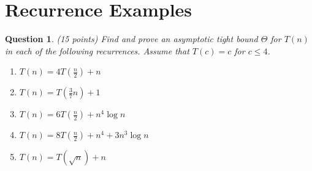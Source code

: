 \documentclass[a4paper]{article}
\theoremstyle{remarksStyle}
\theoremstyle{questionStyle}
\newtheorem{question}{Question}
\theoremstyle{answerStyle}
\begin{document}
\section {Recurrence Examples}
\begin{question} (15 points)
Find and prove an asymptotic tight bound $\Theta$ for $T(n)$ in each of the following recurrences. Assume that $T(c) = c$ for $c \le 4$.
\begin{enumerate}
    \item $T(n) = 4T(\frac{n}{2}) + n$
    \item $T(n) = T(\frac{3}{7}n) + 1$
    \item $T(n) = 6T(\frac{n}{2}) + n^4 \log{n}$
    \item $T(n) = 8T(\frac{n}{2}) + n^4 + 3n^3  \log{n} $
    \item $T(n) = T(\sqrt{n}) + n $
    
\end{enumerate}
\end{question}
\end{document}
